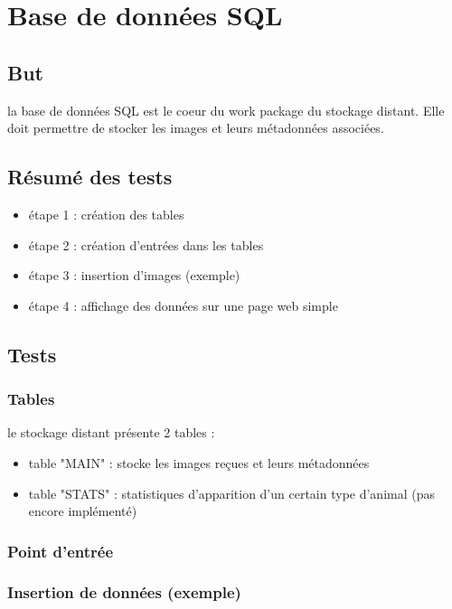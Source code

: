 \section{Base de données SQL}

\subsection{But}
la base de données SQL est le coeur du work package du stockage distant.
Elle doit permettre de stocker les images et leurs métadonnées associées. 

\subsection{Résumé des tests}
\begin{itemize}
  \item étape 1 : création des tables 
  \item étape 2 : création d'entrées dans les tables
  \item étape 3 : insertion d'images (exemple)
  \item étape 4 : affichage des données sur une page web simple
\end{itemize}

\subsection{Tests}

\subsubsection{Tables}
\label{sec:sql_tables}

le stockage distant présente 2 tables :
\begin{itemize}
  \item table "MAIN" : stocke les images reçues et leurs métadonnées
  \item table "STATS" : statistiques d'apparition d'un certain type d'animal (pas encore implémenté)
\end{itemize}

\subsubsection{Point d'entrée}
\label{sec:sql_entree}



\subsubsection{Insertion de données (exemple)}
\label{sec:sql_insertion}


